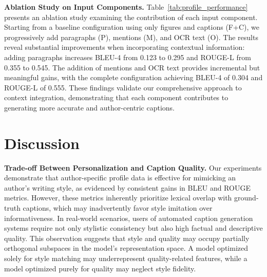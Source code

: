 \documentclass{article} %
\begin{document}
\noindent \textbf{Ablation Study on Input Components.} Table~\ref{tab:profile_performance} presents an ablation study examining the contribution of each input component. Starting from a baseline configuration using only figures and captions (F+C), we progressively add paragraphs (P), mentions (M), and OCR text (O). The results reveal substantial improvements when incorporating contextual information: adding paragraphs increases BLEU-4 from 0.123 to 0.295 and ROUGE-L from 0.355 to 0.545. The addition of mentions and OCR text provides incremental but meaningful gains, with the complete configuration achieving BLEU-4 of 0.304 and ROUGE-L of 0.555. These findings validate our comprehensive approach to context integration, demonstrating that each component contributes to generating more accurate and author-centric captions.

\section{Discussion}

\noindent \textbf{Trade-off Between Personalization and Caption Quality.} Our experiments demonstrate that author-specific profile data is effective for mimicking an author's writing style, as evidenced by consistent gains in BLEU and ROUGE metrics. However, these metrics inherently prioritize lexical overlap with ground-truth captions, which may inadvertently favor style imitation over informativeness. In real-world scenarios, users of automated caption generation systems require not only stylistic consistency but also high factual and descriptive quality. This observation suggests that style and quality may occupy partially orthogonal subspaces in the model’s representation space. A model optimized solely for style matching may underrepresent quality-related features, while a model optimized purely for quality may neglect style fidelity.
\end{document}
